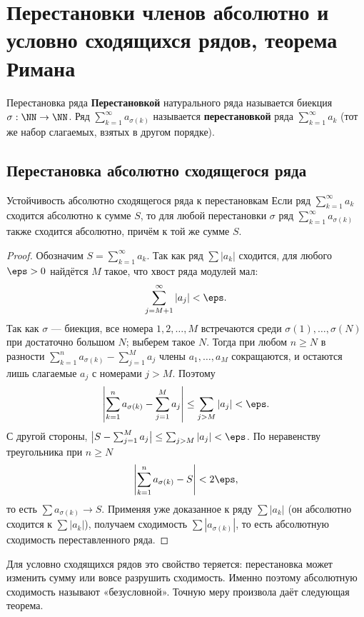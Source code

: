 
\section{Перестановки членов абсолютно и условно сходящихся рядов, теорема Римана}

\begin{Definition}{Перестановка ряда}{}
	\textbf{Перестановкой} натурального ряда называется биекция
	$\sigma:\NN\to\NN$. Ряд $\sum_{k=1}^{\infty} a_{\sigma(k)}$ называется
	\textbf{перестановкой} ряда $\sum_{k=1}^{\infty} a_k$ (тот же набор
	слагаемых, взятых в другом порядке).
\end{Definition}

\subsection*{Перестановка абсолютно сходящегося ряда}

\begin{Theorem}{Устойчивость абсолютно сходящегося ряда к перестановкам}{}
	Если ряд $\sum_{k=1}^{\infty} a_k$ сходится абсолютно к сумме $S$, то для
	любой перестановки $\sigma$ ряд $\sum_{k=1}^{\infty} a_{\sigma(k)}$ также
	сходится абсолютно, причём к той же сумме $S$.
\end{Theorem}

\begin{proof}
	Обозначим $S=\sum_{k=1}^{\infty} a_k$. Так как ряд $\sum|a_k|$ сходится, для
	любого $\eps>0$ найдётся $M$ такое, что хвост ряда модулей мал:
	\[
	\sum_{j=M+1}^{\infty}|a_j|<\eps.
	\]
	Так как $\sigma$ --- биекция, все номера $1,2,\dots,M$ встречаются среди
	$\sigma(1),\dots,\sigma(N)$ при достаточно большом $N$; выберем такое $N$.
	Тогда при любом $n\ge N$ в разности
	$\sum_{k=1}^{n} a_{\sigma(k)}-\sum_{j=1}^{M} a_j$ члены $a_1,\dots,a_M$
	сокращаются, и остаются лишь слагаемые $a_j$ с номерами $j>M$. Поэтому
	\[
	\left|\sum_{k=1}^{n} a_{\sigma(k)}-\sum_{j=1}^{M} a_j\right|
	\le\sum_{\substack{j>M}}|a_j|<\eps.
	\]
	С другой стороны, $\bigl|S-\sum_{j=1}^{M} a_j\bigr|\le\sum_{j>M}|a_j|<\eps$.
	По неравенству треугольника при $n\ge N$
	\[
	\left|\sum_{k=1}^{n} a_{\sigma(k)}-S\right|<2\eps,
	\]
	то есть $\sum a_{\sigma(k)}\to S$. Применяя уже доказанное к ряду $\sum|a_k|$
	(он абсолютно сходится к $\sum|a_k|$), получаем сходимость
	$\sum|a_{\sigma(k)}|$, то есть абсолютную сходимость переставленного ряда.
\end{proof}

\begin{Remark}{}{}
	Для условно сходящихся рядов это свойство теряется: перестановка может
	изменить сумму или вовсе разрушить сходимость. Именно поэтому абсолютную
	сходимость называют «безусловной». Точную меру произвола даёт следующая
	теорема.
\end{Remark}

